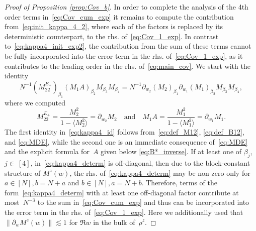 \documentclass[10pt]{amsart}
\numberwithin{equation}{section}
\begin{document}
\begin{proof}[Proof of Proposition \ref{prop:Cov_b}]
In order to complete the analysis of the 4th order terms in~\eqref{eq:Cov_cum_exp} it remains to compute the contribution  from~\eqref{eq:init_kappa_4_2}, where each of the factors is replaced by its deterministic counterpart, to the rhs. of~\eqref{eq:Cov_1_exp}. In contrast to~\eqref{eq:kappa4_init_exp2}, the contribution from the sum of these terms cannot be fully incorporated into the error term in the rhs. of~\eqref{eq:Cov_1_exp}, as it contributes to the leading order in the rhs. of~\eqref{eq:main_cov}. We start with the identity
\begin{equation}
N^{-1}(M_{22}^{E_+})_{\beta_1}(M_1A)_{\beta_2}M_{\beta_3}M_{\beta_4}=N^{-1}\partial_{w_2}(M_2)_{\beta_1}\partial_{w_1}(M_1)_{\beta_2}M_{\beta_3}M_{\beta_4},
\label{eq:kappa4_determ}
\end{equation}
where we computed
\begin{equation}
M_{22}^{E_+}=\frac{M_2^2}{1-\langle M_2^2\rangle} = \partial_{w_2} M_2\quad\text{and}\quad M_1A = \frac{M_1^2}{1-\langle M_1^2\rangle} =\partial_{w_1}M_1.
\label{eq:kappa4_id}
\end{equation}
The first identity in~\eqref{eq:kappa4_id} follows from~\eqref{eq:def_M12}, \eqref{eq:def_B12}, and \eqref{eq:MDE}, while the second one is an immediate consequence of~\eqref{eq:MDE} and the explicit formula for~$A$ given below \eqref{eq:B*_inverse}. If at least one of $\beta_j$, $j\in\!~ [4]$, in~\eqref{eq:kappa4_determ} is off-diagonal, then due to the block-constant structure of $M^z(w)$, the rhs. of~\eqref{eq:kappa4_determ} may be non-zero only for $a\in [N], b=N+a$ and $b\in[N],a=N+b$. Therefore, terms of the form~\eqref{eq:kappa4_determ} with at least one off-diagonal factor contribute at most~$N^{-3}$ to the sum in~\eqref{eq:Cov_cum_exp} and thus can be incorporated into the error term in the rhs. of~\eqref{eq:Cov_1_exp}. Here we additionally used that $\|\partial_w M^z(w)\|\lesssim 1$ for $\Re w$ in the bulk of~$\rho^z$.


\end{proof}
\end{document}
